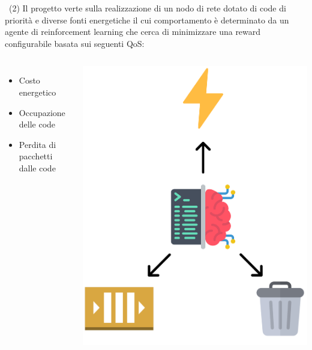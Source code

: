 \documentclass[compress]{beamer}
\begin{document}
\begin{frame}{\subsecname\ (2)}
    Il progetto verte sulla realizzazione di un nodo di rete dotato di code di priorità e diverse fonti energetiche il cui comportamento è determinato da un agente di reinforcement learning che cerca di minimizzare una reward configurabile basata sui seguenti QoS:
    \begin{columns}
            \begin{minipage}[b]{1\textwidth}
                \begin{itemize}
                    \item Costo energetico
                    \item Occupazione delle code
                    \item Perdita di pacchetti dalle code 
                \end{itemize}
            \end{minipage}
                \begin{minipage}{1\textwidth}
                    \begin{adjustbox}{margin=0cm 0cm 0cm 0cm, center} %
                        \includegraphics[width=.65\textwidth]{figs/agent_icon.png}
                    \end{adjustbox}
                \end{minipage}
    \end{columns}
\end{frame}
\end{document}
